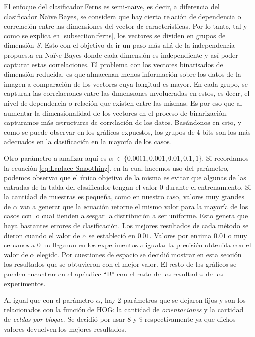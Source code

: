 	El enfoque del clasificador Ferns es semi-na\"{i}ve, es decir, a diferencia del clasificador Na\"{i}ve Bayes, se considera que hay cierta relación de dependencia o correlación entre las dimensiones del vector de características. Por lo tanto, tal y como se explica en \ref{subsection:ferns}, los vectores se dividen en grupos de dimensión \textit{S}. Esto con el objetivo de ir un paso más allá de la independencia propuesta en Na\"{i}ve Bayes donde cada dimensión es independiente y así poder capturar estas correlaciones. El problema con los vectores binarizados de dimensión reducida, es que almacenan menos información sobre los datos de la imagen a comparación de los vectores cuya longitud es mayor. En cada grupo, se capturan las correlaciones entre las dimensiones involucradas en estos, es decir, el nivel de dependencia o relación que existen entre las mismas. Es por eso que al aumentar la dimensionalidad de los vectores en el proceso de binarización, capturamos más estructuras de correlación de los datos. Basándonos en esto, y como se puede observar en los gráficos expuestos, los grupos de $4$ bits son los más adecuados en la clasificación en la mayoría de los casos.

	Otro parámetro a analizar aquí es \textit{$\alpha$} $\in \{ 0.0001, 0.001, 0.01, 0.1, 1\}$. Si recordamos la ecuación \ref{eq:Laplace-Smoothing}, en la cual hacemos uso del parámetro, podemos observar que el único objetivo de la misma es evitar que algunas de las entradas de la tabla del clasificador tengan el valor $0$ durante el entrenamiento. Si la cantidad de muestras es pequeña, como en nuestro caso, valores muy grandes de $\alpha$ van a generar que la ecuación retorne el mismo valor para la mayoría de los casos con lo cual tienden a sesgar la distribución a ser uniforme.  Esto genera que haya bastantes errores de clasificación. Los mejores resultados de cada método se dieron cuando el valor de \textit{$\alpha$} se estableció en $0.01$. Valores por encima $0.01$ o muy cercanos a 0 no llegaron en los experimentos a igualar la precisión obtenida con el valor de \textit{$\alpha$} elegido. Por cuestiones de espacio se decidió mostrar en esta sección los resultados que se obtuvieron con el mejor valor. El resto de los gráficos se pueden encontrar en el apéndice ``B'' con el resto de los resultados de los experimentos.

	Al igual que con el parámetro \textit{$\alpha$}, hay $2$ parámetros que se dejaron fijos y son los relacionados con la función de HOG: la cantidad de \textit{orientaciones} y la cantidad de \textit{celdas por bloque}. Se decidió por usar $8$ y $9$ respectivamente ya que dichos valores devuelven los mejores resultados.

